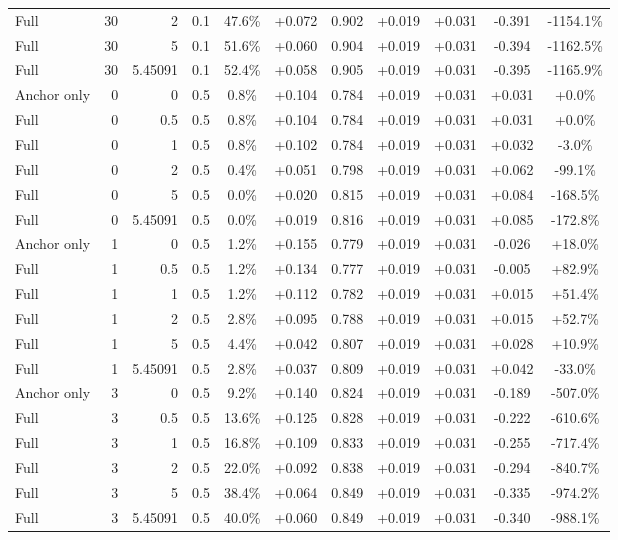 \begin{table}[htbp]
\begin{tabular}{lrrrccccccc}
Full & 30 & 2 & 0.1 & 47.6\% & +0.072 & 0.902 & +0.019 & +0.031 & -0.391 & -1154.1\% \\
Full & 30 & 5 & 0.1 & 51.6\% & +0.060 & 0.904 & +0.019 & +0.031 & -0.394 & -1162.5\% \\
Full & 30 & 5.45091 & 0.1 & 52.4\% & +0.058 & 0.905 & +0.019 & +0.031 & -0.395 & -1165.9\% \\
Anchor only & 0 & 0 & 0.5 & 0.8\% & +0.104 & 0.784 & +0.019 & +0.031 & +0.031 & +0.0\% \\
Full & 0 & 0.5 & 0.5 & 0.8\% & +0.104 & 0.784 & +0.019 & +0.031 & +0.031 & +0.0\% \\
Full & 0 & 1 & 0.5 & 0.8\% & +0.102 & 0.784 & +0.019 & +0.031 & +0.032 & -3.0\% \\
Full & 0 & 2 & 0.5 & 0.4\% & +0.051 & 0.798 & +0.019 & +0.031 & +0.062 & -99.1\% \\
Full & 0 & 5 & 0.5 & 0.0\% & +0.020 & 0.815 & +0.019 & +0.031 & +0.084 & -168.5\% \\
Full & 0 & 5.45091 & 0.5 & 0.0\% & +0.019 & 0.816 & +0.019 & +0.031 & +0.085 & -172.8\% \\
Anchor only & 1 & 0 & 0.5 & 1.2\% & +0.155 & 0.779 & +0.019 & +0.031 & -0.026 & +18.0\% \\
Full & 1 & 0.5 & 0.5 & 1.2\% & +0.134 & 0.777 & +0.019 & +0.031 & -0.005 & +82.9\% \\
Full & 1 & 1 & 0.5 & 1.2\% & +0.112 & 0.782 & +0.019 & +0.031 & +0.015 & +51.4\% \\
Full & 1 & 2 & 0.5 & 2.8\% & +0.095 & 0.788 & +0.019 & +0.031 & +0.015 & +52.7\% \\
Full & 1 & 5 & 0.5 & 4.4\% & +0.042 & 0.807 & +0.019 & +0.031 & +0.028 & +10.9\% \\
Full & 1 & 5.45091 & 0.5 & 2.8\% & +0.037 & 0.809 & +0.019 & +0.031 & +0.042 & -33.0\% \\
Anchor only & 3 & 0 & 0.5 & 9.2\% & +0.140 & 0.824 & +0.019 & +0.031 & -0.189 & -507.0\% \\
Full & 3 & 0.5 & 0.5 & 13.6\% & +0.125 & 0.828 & +0.019 & +0.031 & -0.222 & -610.6\% \\
Full & 3 & 1 & 0.5 & 16.8\% & +0.109 & 0.833 & +0.019 & +0.031 & -0.255 & -717.4\% \\
Full & 3 & 2 & 0.5 & 22.0\% & +0.092 & 0.838 & +0.019 & +0.031 & -0.294 & -840.7\% \\
Full & 3 & 5 & 0.5 & 38.4\% & +0.064 & 0.849 & +0.019 & +0.031 & -0.335 & -974.2\% \\
Full & 3 & 5.45091 & 0.5 & 40.0\% & +0.060 & 0.849 & +0.019 & +0.031 & -0.340 & -988.1\% \\

\end{tabular}
\end{table}
